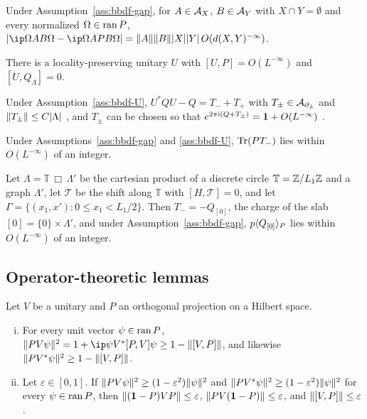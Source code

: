 \begin{proposition}\label{prop:bbdf-cluster}
Under Assumption~\ref{ass:bbdf-gap}, for $A\in\mathcal{A}_X$, $B\in\mathcal{A}_Y$ with $X\cap Y=\emptyset$ and every normalized
$\Omega\in\operatorname{ran} P$, $\abs{\ip\Omega{AB\Omega}-\ip\Omega{APB\Omega}}=\norm A\norm B\abs X\abs Y\,O(d(X,Y)^{-\infty})$.
\end{proposition}

\begin{assumption}\label{ass:bbdf-U}
There is a locality-preserving unitary $U$ with $[U,P]=O(L^{-\infty})$ and $[U,Q_\Lambda]=0$.
\end{assumption}

Under Assumption~\ref{ass:bbdf-U}, $U^*QU-Q=T_-+T_+$ with $T_\pm\in\mathcal{A}_{\partial_\pm}$ and $\lVert T_\pm\rVert\le C\lvert\Lambda\rvert$
\cite[(3.3)]{BBDF21}, and $T_\pm$ can be chosen so that $e^{2\pi\mathrm{i}(Q+T_\pm)}=\mathbf{1}+O(L^{-\infty})$ \cite[(3.4)]{BBDF21}.

\begin{theorem}\label{thm:bbdf-index}
Under Assumptions~\ref{ass:bbdf-gap} and \ref{ass:bbdf-U}, $\operatorname{Tr}(PT_-)$ lies within $O(L^{-\infty})$ of an integer.
\end{theorem}

\begin{corollary}\label{cor:bbdf-lsm}
Let $\Lambda=\mathbb T\,\Box\,\Lambda'$ be the cartesian product of a discrete circle $\mathbb T=\mathbb{Z}/L_1\mathbb{Z}$ and a graph
$\Lambda'$, let $\mathcal T$ be the shift along $\mathbb T$ with $[H,\mathcal T]=0$, and let $\Gamma=\{(x_1,x'):0\le x_1<L_1/2\}$.
Then $T_-=-Q_{[0]}$, the charge of the slab $[0]=\{0\}\times\Lambda'$, and under Assumption~\ref{ass:bbdf-gap},
$p\langle Q_{[0]}\rangle_{P}$ lies within $O(L^{-\infty})$ of an integer.
\end{corollary}

\subsection{Operator-theoretic lemmas}

\begin{lemma}\label{lem:bbdf41}
Let $V$ be a unitary and $P$ an orthogonal projection on a Hilbert space.
\begin{enumerate}[(i)]
\item For every unit vector $\psi\in\operatorname{ran} P$, $\norm{PV\psi}^2=1+\ip\psi{V^*[P,V]\psi}\ge1-\norm{[V,P]}$, and likewise
$\lVert PV^*\psi\rVert^2\ge1-\lVert[V,P]\rVert$.
\item Let $\varepsilon\in[0,1]$. If $\lVert PV\psi\rVert^2\ge(1-\varepsilon^2)\lVert\psi\rVert^2$ and $\lVert PV^*\psi\rVert^2\ge(1-\varepsilon^2)\lVert\psi\rVert^2$ for
every $\psi\in\operatorname{ran} P$, then $\lVert(\mathbf{1}-P)VP\rVert\le\varepsilon$, $\lVert PV(\mathbf{1}-P)\rVert\le\varepsilon$, and $\lVert[V,P]\rVert\le\varepsilon$.
\end{enumerate}
\end{lemma}

